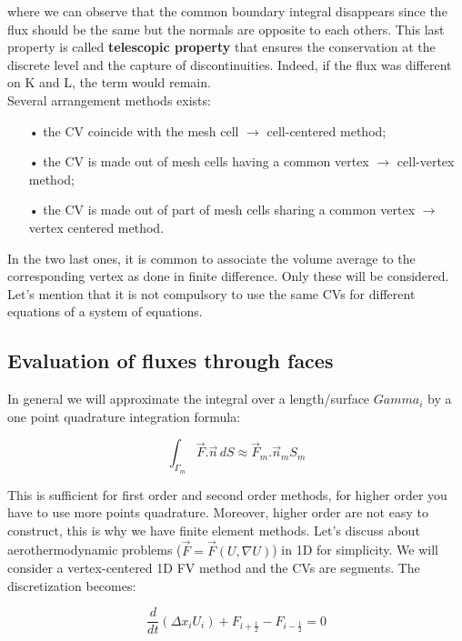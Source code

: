 where we can observe that the common boundary integral disappears since the flux should be the same but the normals are opposite to each others. This last property is called \textbf{telescopic property} that ensures the conservation at the discrete level and the capture of discontinuities. Indeed, if the flux was different on K and L, the term would remain. \\

Several arrangement methods exists: 
\begin{itemize}
\item[•] the CV coincide with the mesh cell $\rightarrow$ cell-centered method;
\item[•] the CV is made out of mesh cells having a common vertex $\rightarrow$ cell-vertex method;
\item[•] the CV is made out of part of mesh cells sharing a common vertex $\rightarrow$ vertex centered method. \\
\end{itemize}

In the two last ones, it is common to associate the volume average to the corresponding vertex as done in finite difference. Only these will be considered. Let's mention that it is not compulsory to use the same CVs for different equations of a system of equations. 

\subsection{Evaluation of fluxes through faces}
In general we will approximate the integral over a length/surface $Gamma _i$ by a one point quadrature integration formula: 

\begin{equation}
\int _{\Gamma _m} \vec{F}.\vec{n} \, dS \approx \vec{F}_m .\vec{n}_m S_m
\end{equation}

This is sufficient for first order and second order methods, for higher order you have to use more points quadrature. Moreover, higher order are not easy to construct, this is why we have finite element methods. Let's discuss about aerothermodynamic problems ($\vec{F} = \vec{F} (U, \nabla U)$) in 1D for simplicity. We will consider a vertex-centered 1D FV method and the CVs are segments. The discretization becomes: 

\begin{equation}
\frac{d}{dt} (\Delta x_i U_i) + F_{i+\frac{1}{2}} - F_{i-\frac{1}{2}} = 0
\label{1.21}
\end{equation}

